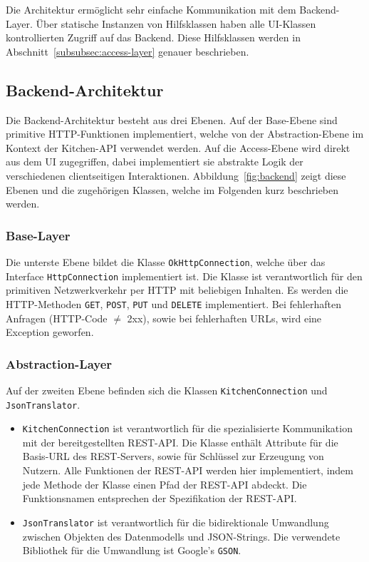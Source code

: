 Die Architektur ermöglicht sehr einfache Kommunikation mit dem Backend-Layer.
Über statische Instanzen von Hilfsklassen haben alle UI-Klassen kontrollierten Zugriff auf das Backend.
Diese Hilfsklassen werden in Abschnitt~\ref{subsubsec:access-layer} genauer beschrieben.

\subsection{Backend-Architektur}\label{subsec:backend}

Die Backend-Architektur besteht aus drei Ebenen.
Auf der Base-Ebene sind primitive HTTP-Funktionen implementiert,
welche von der Abstraction-Ebene im Kontext der Kitchen-API verwendet werden.
Auf die Access-Ebene wird direkt aus dem UI zugegriffen, dabei implementiert sie abstrakte Logik der verschiedenen clientseitigen Interaktionen.
Abbildung~\ref{fig:backend} zeigt diese Ebenen und die zugehörigen Klassen, welche im Folgenden kurz beschrieben werden.


\subsubsection{Base-Layer}

Die unterste Ebene bildet die Klasse \texttt{OkHttpConnection}, welche über das Interface \texttt{HttpConnection} implementiert ist.
Die Klasse ist verantwortlich für den primitiven Netzwerkverkehr per HTTP mit beliebigen Inhalten.
Es werden die HTTP-Methoden \texttt{GET}, \texttt{POST}, \texttt{PUT} und \texttt{DELETE} implementiert.
Bei fehlerhaften Anfragen (HTTP-Code $\neq$ 2xx), sowie bei fehlerhaften URLs, wird eine Exception geworfen.

\subsubsection{Abstraction-Layer}

Auf der zweiten Ebene befinden sich die Klassen \texttt{KitchenConnection} und \texttt{JsonTranslator}.

\begin{itemize}
	\item  \texttt{KitchenConnection} ist verantwortlich für die spezialisierte Kommunikation mit der bereitgestellten REST-API. Die Klasse enthält Attribute für die Basis-URL des REST-Servers, sowie für Schlüssel zur Erzeugung von Nutzern.
	Alle Funktionen der REST-API werden hier implementiert, indem jede Methode der Klasse einen Pfad der REST-API abdeckt.
	Die Funktionsnamen entsprechen der Spezifikation der REST-API\@.

	\item \texttt{JsonTranslator} ist verantwortlich für die bidirektionale Umwandlung zwischen Objekten des Datenmodells und JSON-Strings.
	Die verwendete Bibliothek für die Umwandlung ist Google's \texttt{GSON}.
\end{itemize}

